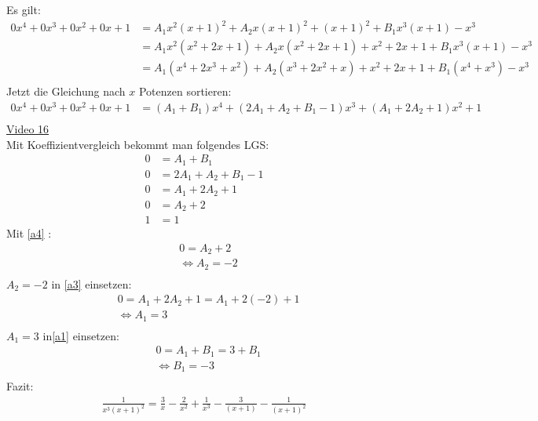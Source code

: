 Es gilt:\\
\begin{align*}
0x^4+0x^3+0x^2+0x+1&=A_1x^2(x+1)^2 +A_2x(x+1)^2+(x+1)^2+B_1x^3(x+1)-x^3\\
&=A_1x^2(x^2+2x+1)+A_2x(x^2+2x+1)+x^2+2x+1+B_1x^3(x+1)-x^3\\
&=A_1(x^4+2x^3+x^2)+A_2(x^3+2x^2+x)+x^2+2x+1+B_1(x^4+x^3)-x^3\\
\end{align*}
Jetzt die Gleichung nach $ x $ Potenzen sortieren:\\
\begin{align*}
0x^4+0x^3+0x^2+0x+1&=(A_1+B_1)x^4+(2A_1+A_2+B_1-1)x^3+(A_1+2A_2+1)x^2+1\\
\end{align*}
\href{https://youtu.be/_I2IcH8-JMw}{Video 16}\\
Mit Koeffizientvergleich bekommt man folgendes LGS:\\
\begin{align}
0&=A_1+B_1 \label{a1}\\
0&=2A_1+A_2+B_1-1 \label{a2}\\
0&=A_1+2A_2+1 \label{a3}\\
0&=A_2+2\label{a4}\\
1&=1
\end{align}
Mit \ref{a4} :\\
\begin{align*}
&0=A_2+2\\
&\Leftrightarrow A_2=-2\\
\end{align*}
$ A_2=-2 $ in \ref{a3} einsetzen:\\
\begin{align*}
&0=A_1+2A_2+1=A_1+2(-2)+1\\
&\Leftrightarrow A_1=3\\
\end{align*}
$ A_1=3 $ in\ref{a1} einsetzen:\\
\begin{align*}
&0=A_1+B_1=3+B_1\\
&\Leftrightarrow B_1=-3\\
\end{align*}
Fazit:\\
\begin{align*}
\frac{1}{x^3(x+1)^2}=\frac{3}{x}-\frac{2}{x^2}+\frac{1}{x^3}-\frac{3}{(x+1)}-\frac{1}{(x+1)^2}\\
\end{align*}

